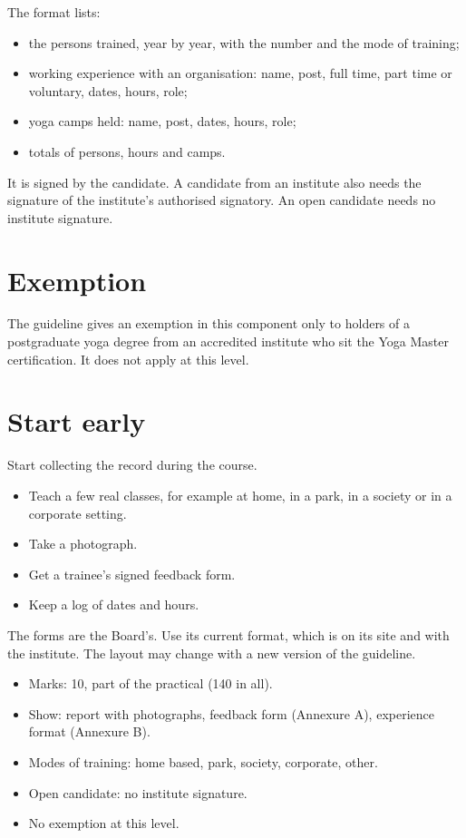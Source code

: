The format lists:
\begin{itemize}
\item the persons trained, year by year, with the number and the mode of training;
\item working experience with an organisation: name, post, full time, part time or voluntary, dates, hours, role;
\item yoga camps held: name, post, dates, hours, role;
\item totals of persons, hours and camps.
\end{itemize}

It is signed by the candidate. A candidate from an institute also needs the signature of the institute's authorised signatory. An open candidate needs no institute signature.

\section*{Exemption}

The guideline gives an exemption in this component only to holders of a postgraduate yoga degree from an accredited institute who sit the Yoga Master certification. It does not apply at this level.

\section*{Start early}

Start collecting the record during the course.
\begin{itemize}
\item Teach a few real classes, for example at home, in a park, in a society or in a corporate setting.
\item Take a photograph.
\item Get a trainee's signed feedback form.
\item Keep a log of dates and hours.
\end{itemize}

The forms are the Board's. Use its current format, which is on its site and with the institute. The layout may change with a new version of the guideline.

\begin{recall}
\begin{itemize}
\item Marks: 10, part of the practical (140 in all).
\item Show: report with photographs, feedback form (Annexure A), experience format (Annexure B).
\item Modes of training: home based, park, society, corporate, other.
\item Open candidate: no institute signature.
\item No exemption at this level.
\end{itemize}
\end{recall}


